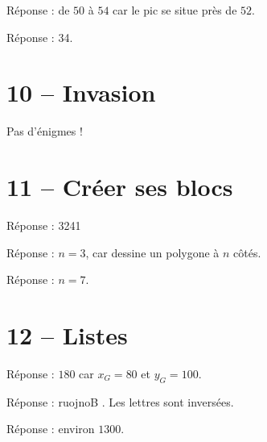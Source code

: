 \documentclass[class=report,crop=false, 12pt]{standalone}
\begin{document}
\begin{enigme}
Réponse : de $50$ à $54$ car le pic se situe près de $52$.
\end{enigme}

\begin{enigme}
Réponse : 34.
\end{enigme}


\section*{10 -- Invasion}

Pas d'énigmes !


\section*{11 -- Créer ses blocs}

\setcounter{enigme}{0}

\begin{enigme}
Réponse : 3241
\end{enigme}

\begin{enigme}
Réponse : $n=3$, car  dessine un polygone à $n$ côtés.
\end{enigme}

\begin{enigme}
Réponse : $n=7$.
\end{enigme}


\section*{12 -- Listes}

\setcounter{enigme}{0}

\begin{enigme}
Réponse : $180$ car $x_G = 80$ et $y_G = 100$. 
\end{enigme}

\begin{enigme}
Réponse : \og ruojnoB \fg{}. Les lettres sont inversées. 
\end{enigme}

\begin{enigme}
Réponse : environ $1300$.
\end{enigme}
\end{document}
